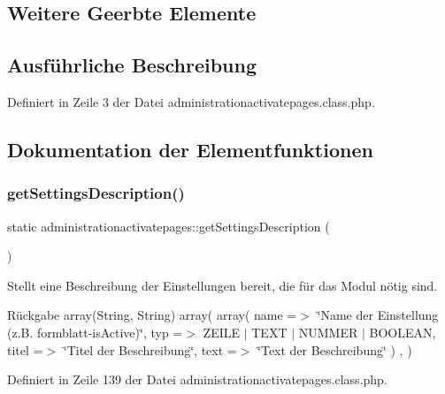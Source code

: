 \subsection*{Weitere Geerbte Elemente}


\subsection{Ausführliche Beschreibung}


Definiert in Zeile 3 der Datei administrationactivatepages.\+class.\+php.



\subsection{Dokumentation der Elementfunktionen}
\mbox{\label{classadministrationactivatepages_a8b1a7b5da0e76699cd9a409ca3daf1f4}} 
\subsubsection{\texorpdfstring{get\+Settings\+Description()}{getSettingsDescription()}}
{\footnotesize\ttfamily static administrationactivatepages\+::get\+Settings\+Description (\begin{DoxyParamCaption}{ }\end{DoxyParamCaption})\hspace{0.3cm}{\ttfamily [static]}}

Stellt eine Beschreibung der Einstellungen bereit, die für das Modul nötig sind. \begin{DoxyReturn}{Rückgabe}
array(\+String, String) array( array( \textquotesingle{}name\textquotesingle{} =$>$ \char`\"{}\+Name der Einstellung (z.\+B. formblatt-\/is\+Active)\char`\"{}, \textquotesingle{}typ\textquotesingle{} =$>$ Z\+E\+I\+LE $\vert$ T\+E\+XT $\vert$ N\+U\+M\+M\+ER $\vert$ B\+O\+O\+L\+E\+AN, \textquotesingle{}titel\textquotesingle{} =$>$ \char`\"{}\+Titel der Beschreibung\char`\"{}, \textquotesingle{}text\textquotesingle{} =$>$ \char`\"{}\+Text der Beschreibung\char`\"{} ) , ) 
\end{DoxyReturn}


Definiert in Zeile 139 der Datei administrationactivatepages.\+class.\+php.


